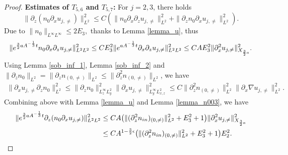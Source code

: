 \documentclass[12pt, reqno]{amsart}
\numberwithin{equation}{section}
\begin{document}
\begin{proof}
		\noindent\textbf{Estimates of $T_{5,6}$ and $T_{5,7}$:}
		For $j=2,3$, there holds $$\|
		\partial_z(n_0\partial_xu_{j,\neq})\|_{L^2}^2
		\leq C(\|n_0\partial_x\partial_zu_{j,\neq}\|^2_{L^2}
		+\|\partial_zn_0\partial_xu_{j,\neq}\|^2_{L^2}).$$
		Due to $\|n_0\|_{L^{\infty}L^{\infty}}\leq 2E_3,$ thanks to  Lemma \ref{lemma_u}, thus 
		\begin{equation*}
			\begin{aligned}
				\|{\rm e}^{\frac32aA^{-\frac{1}{3}}t}
				n_0\partial_x\partial_zu_{j,\neq}\|^2_{L^2L^2}
				\leq CE_3^2\|{\rm e}^{aA^{-\frac{1}{3}}t}\partial_x\partial_zu_{j,\neq}\|^2_{L^2L^2}
				\leq CAE_3^2\|\partial_x^2u_{j,\neq}\|^2_{X_{\frac32a}}.
			\end{aligned}
		\end{equation*}
		Using Lemma \ref{sob_inf_1}, Lemma \ref{sob_inf_2}
		and $\|\partial_zn_{0}\|_{L^2}=\|\partial_zn_{(0,\neq)}\|_{L^2}\leq \|\partial_z^2n_{(0,\neq)}\|_{L^2}$, we have
		\begin{equation*}
			\begin{aligned}						\|\partial_xu_{j,\neq}\partial_zn_{0}\|^2_{L^2}\leq 
				\|\partial_zn_0\|^2_{L^{\infty}_zL^2_y}
				\|\partial_xu_{j,\neq}\|^2_{L^{\infty}_{y}L^2_{x,z}}
				\leq C\|\partial_z^2n_{(0,\neq)}\|^2_{L^2}
				\|\partial_x\nabla u_{j,\neq}\|_{L^2}^2.
			\end{aligned}
		\end{equation*}
		Combining above with Lemma \ref{lemma_u} and Lemma \ref{lemma_n003},  we have
		\begin{equation*}
			\begin{aligned}
				{\|{\rm e}^{\frac32aA^{-\frac{1}{3}}t}
					\partial_z(n_0\partial_xu_{j,\neq})\|_{L^2L^2}^2}
				&\leq CA
				\big(\|(\partial_z^2n_{\rm in})_{(0,\neq)}
				\|_{L^2}^2+E_3^2+1\big)
				\|\partial_x^2u_{j,\neq}\|^2_{X_{\frac32a}}\\
				&\leq CA^{1-\frac32\epsilon}
				\big(\|(\partial_z^2n_{\rm in})_{(0,\neq)}
				\|_{L^2}^2+E_3^2+1\big)
				E_2^2.
			\end{aligned}
		\end{equation*}
		

\end{proof}
\end{document}
